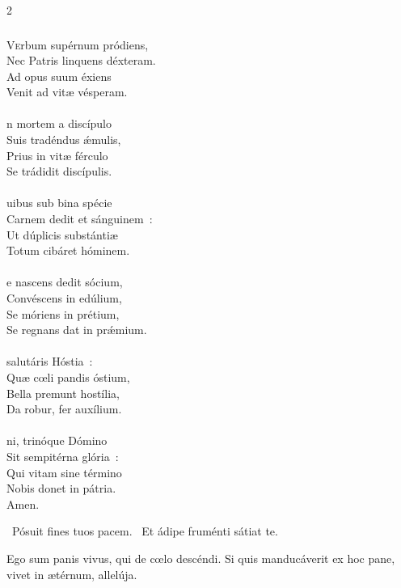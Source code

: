 \documentclass[9pt,twoside]{extarticle}
\begin{document}
\begin{multicols}{2}
\subsubsection*{\center {}}
\begin{center}\end{center}
\lettrine{V}erbum supérnum pródiens,\\
Nec Patris linquens déxteram.\\
Ad opus suum éxiens\\
Venit ad vitæ vésperam.\\
\\
n mortem a discípulo\\
Suis tradéndus ǽmulis,\\
Prius in vitæ férculo\\
Se trádidit discípulis.\\
\\
uibus sub bina spécie\\
Carnem dedit et sánguinem~:\\
Ut dúplicis substántiæ\\
Totum cibáret hóminem.\\
\\
e nascens dedit sócium,\\
Convéscens in edúlium,\\
Se móriens in prétium,\\
Se regnans dat in prǽmium.\\
\\
 salutáris Hóstia~:\\
Quæ cœli pandis óstium,\\
Bella premunt hostília,\\
Da robur, fer auxílium.\\
\\
ni, trinóque Dómino\\
Sit sempitérna glória~:\\
Qui vitam sine término\\
Nobis donet in pátria.\\
Amen.

\begin{tightlist}{}
\item {}~Pósuit fines tuos pacem. ~Et ádipe fruménti sátiat te.
\item {} Ego sum panis vivus, qui de cœlo descéndi. Si quis manducáverit ex hoc pane, vivet in ætérnum, allelúja. 
\end{tightlist}


\end{multicols}
\end{document}
